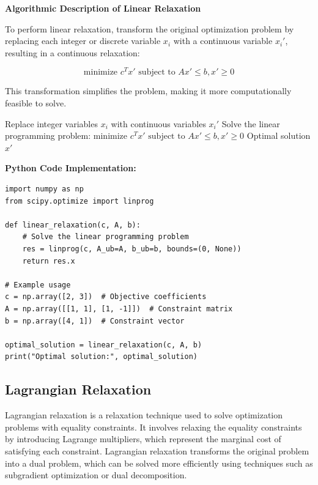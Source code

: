 \documentclass[12pt]{book} %
\begin{document}
\textbf{Algorithmic Description of Linear Relaxation}

To perform linear relaxation, transform the original optimization problem by replacing each integer or discrete variable \(x_i\) with a continuous variable \(x_i'\), resulting in a continuous relaxation:

\[
\text{minimize } c^T x' \text{ subject to } A x' \leq b, x' \geq 0
\]

This transformation simplifies the problem, making it more computationally feasible to solve.

\FloatBarrier
\begin{algorithm}
\caption{Linear Relaxation Algorithm}
\begin{algorithmic}[1]
    \State Replace integer variables $x_i$ with continuous variables $x_i'$
    \State Solve the linear programming problem:
    \State \hspace{\algorithmicindent} $\text{minimize } c^Tx' \text{ subject to } Ax' \leq b, x' \geq 0$
    \State \Return Optimal solution $x'$
\EndFunction
\end{algorithmic}
\end{algorithm}
\FloatBarrier
\textbf{Python Code Implementation:}
\FloatBarrier
\begin{lstlisting}
import numpy as np
from scipy.optimize import linprog

def linear_relaxation(c, A, b):
    # Solve the linear programming problem
    res = linprog(c, A_ub=A, b_ub=b, bounds=(0, None))
    return res.x

# Example usage
c = np.array([2, 3])  # Objective coefficients
A = np.array([[1, 1], [1, -1]])  # Constraint matrix
b = np.array([4, 1])  # Constraint vector

optimal_solution = linear_relaxation(c, A, b)
print("Optimal solution:", optimal_solution)
\end{lstlisting}


\subsection{Lagrangian Relaxation}

Lagrangian relaxation is a relaxation technique used to solve optimization problems with equality constraints. It involves relaxing the equality constraints by introducing Lagrange multipliers, which represent the marginal cost of satisfying each constraint. Lagrangian relaxation transforms the original problem into a dual problem, which can be solved more efficiently using techniques such as subgradient optimization or dual decomposition.
\end{document}

